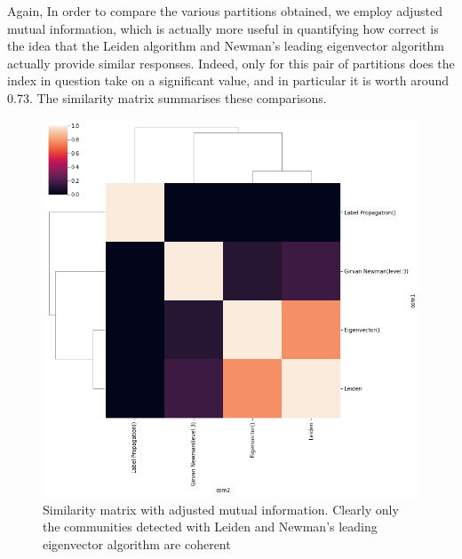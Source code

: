 \documentclass[sigchi]{acmart}
\begin{document}
Again, 
In order to compare the various partitions obtained, we employ adjusted mutual information, which is actually more useful in quantifying how correct is the idea that the Leiden algorithm and Newman's leading eigenvector algorithm actually provide similar responses. Indeed, only for this pair of partitions does the index in question take on a significant value, and in particular it is worth around 0.73. The similarity matrix summarises these comparisons.


\begin{figure}[H]
	\centering
	\includegraphics[width=\linewidth]{simm_mat.png}
	\caption{Similarity matrix with adjusted mutual information. Clearly only the communities detected with Leiden and Newman's leading eigenvector algorithm are coherent}
\end{figure}
\end{document}
